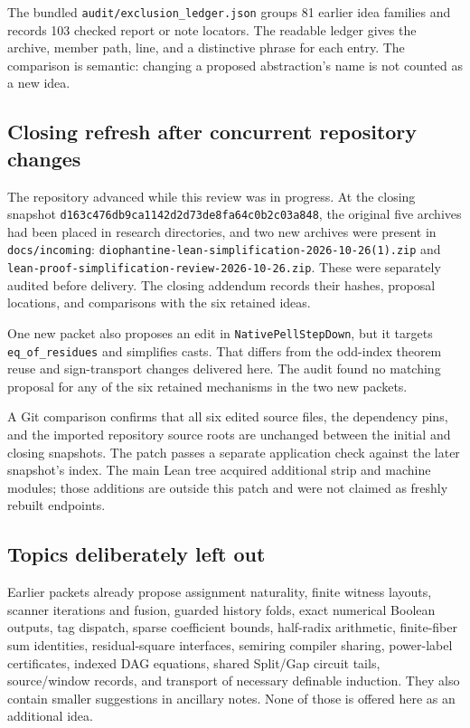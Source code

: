 \documentclass[11pt,letterpaper]{article}
\newcommand{\code}[1]{\nolinkurl{#1}}
\begin{document}
The bundled \code{audit/exclusion_ledger.json} groups 81 earlier idea families
and records 103 checked report or note locators. The readable ledger gives the
archive, member path, line, and a distinctive phrase for each entry. The
comparison is semantic: changing a proposed abstraction's name is not counted
as a new idea.

\subsection{Closing refresh after concurrent repository changes}

The repository advanced while this review was in progress. At the closing
snapshot \code{d163c476db9ca1142d2d73de8fa64c0b2c03a848}, the original five
archives had been placed in research directories, and two new archives were
present in \code{docs/incoming}:
\code{diophantine-lean-simplification-2026-10-26(1).zip} and
\code{lean-proof-simplification-review-2026-10-26.zip}. These were separately
audited before delivery. The closing addendum records their hashes, proposal
locations, and comparisons with the six retained ideas.

One new packet also proposes an edit in \code{NativePellStepDown}, but it
targets \code{eq_of_residues} and simplifies casts. That differs from the
odd-index theorem reuse and sign-transport changes delivered here. The audit
found no matching proposal for any of the six retained mechanisms in the
two new packets.

A Git comparison confirms that all six edited source files, the dependency
pins, and the imported repository source roots are unchanged between the
initial and closing snapshots. The patch passes a separate application check
against the later snapshot's index. The main Lean tree acquired additional
strip and machine modules; those additions are outside this patch and were
not claimed as freshly rebuilt endpoints.

\subsection{Topics deliberately left out}

Earlier packets already propose assignment naturality, finite witness layouts,
scanner iterations and fusion, guarded history folds, exact numerical Boolean
outputs, tag dispatch, sparse coefficient bounds, half-radix arithmetic,
finite-fiber sum identities, residual-square interfaces, semiring compiler
sharing, power-label certificates, indexed DAG equations, shared Split/Gap
circuit tails, source/window records, and transport of necessary definable
induction. They also contain smaller suggestions in ancillary notes. None of
those is offered here as an additional idea.
\end{document}
